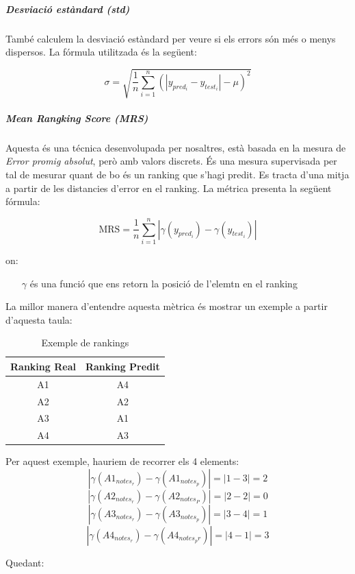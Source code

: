 \documentclass[12pt,a4paper,catalan]{article}
\begin{document}
\subparagraph{Desviació estàndard (std)}
També calculem la desviació estàndard per veure si els errors són més o menys dispersos. La fórmula utilitzada és la següent:

$$ \sigma = \sqrt{ \frac{1}{n} \sum_{i=1}^n (\left| y_{pred_i}-y_{test_i}\right| - \mu)^2 } $$

\subparagraph{\textit{Mean Rangking Score (MRS)}}
\label{subpar:mrs}
Aquesta és una técnica desenvolupada per nosaltres, està basada en la mesura de \textit{Error promig absolut}, però amb valors discrets. És una mesura supervisada per tal de mesurar quant de bo és un ranking que s'hagi predit. Es tracta d'una mitja a partir de les distancies d'error en el ranking. La métrica presenta la següent fórmula:

$$ \mathrm{MRS} = \frac{1}{n}\sum_{i=1}^n \left| \gamma(y_{pred_i}) -  \gamma(y_{test_i})\right| $$

on:
\begin{itemize}[leftmargin=.5in]
	\item [$\gamma$] és una funció que ens retorn la posició de l'elemtn en el ranking
\end{itemize}

\newpage

La millor manera d'entendre aquesta mètrica és mostrar un exemple a partir d'aquesta taula:

\begin{table}[h]
\centering
\begin{tabular}{@{}cc@{}}
\toprule
Ranking Real & Ranking Predit \\ \midrule
A1           & A4             \\
A2           & A2             \\
A3           & A1             \\
A4           & A3             \\ \bottomrule
\end{tabular}
\caption{Exemple de rankings}
\end{table}

Per aquest exemple, hauriem de recorrer els 4 elements:
	$$\left|\gamma(A1_{notes_r}) - \gamma(A1_{notes_p})\right| = \left| 1 - 3 \right| = 2$$
	$$\left|\gamma(A2_{notes_r}) - \gamma(A2_{notes_P})\right| = \left| 2 - 2 \right| = 0$$
	$$\left|\gamma(A3_{notes_r}) - \gamma(A3_{notes_p})\right| = \left| 3 - 4 \right| = 1$$
	$$\left|\gamma(A4_{notes_r}) - \gamma(A4_{notes_pr})\right| = \left| 4 - 1 \right| = 3$$

Quedant:
\end{document}
